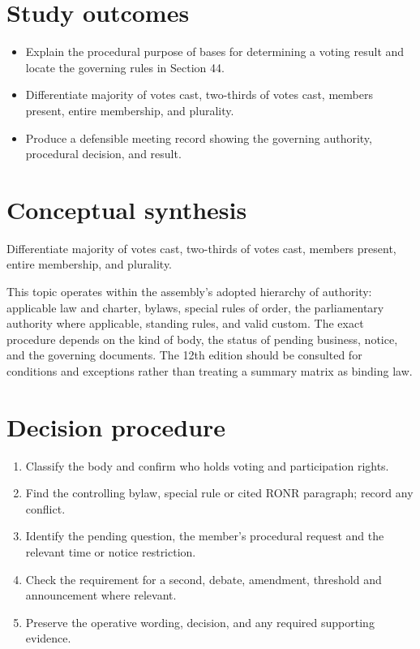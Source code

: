 \documentclass[11pt]{article}
\begin{document}
\SuiteOpen
{}
\section{Study outcomes}
\begin{itemize}[leftmargin=*,itemsep=4pt]
\item Explain the procedural purpose of bases for determining a voting result and locate the governing rules in Section 44.
\item Differentiate majority of votes cast, two-thirds of votes cast, members present, entire membership, and plurality.
\item Produce a defensible meeting record showing the governing authority, procedural decision, and result.
\end{itemize}

\section{Conceptual synthesis}
Differentiate majority of votes cast, two-thirds of votes cast, members present, entire membership, and plurality.

This topic operates within the assembly’s adopted hierarchy of authority: applicable law and charter, bylaws, special rules of order, the parliamentary authority where applicable, standing rules, and valid custom. The exact procedure depends on the kind of body, the status of pending business, notice, and the governing documents. The 12th edition should be consulted for conditions and exceptions rather than treating a summary matrix as binding law.
\section{Decision procedure}
\begin{enumerate}[leftmargin=*,itemsep=4pt]
\item Classify the body and confirm who holds voting and participation rights.
\item Find the controlling bylaw, special rule or cited RONR paragraph; record any conflict.
\item Identify the pending question, the member’s procedural request and the relevant time or notice restriction.
\item Check the requirement for a second, debate, amendment, threshold and announcement where relevant.
\item Preserve the operative wording, decision, and any required supporting evidence.
\end{enumerate}
\end{document}
